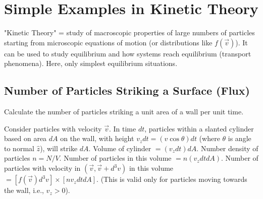 \documentclass[11pt]{article}
\begin{document}
\begin{itemize}
    \begin{center}
    \end{center}
\end{itemize}

\section*{Simple Examples in Kinetic Theory}

"Kinetic Theory" = study of macroscopic properties of large numbers of particles starting from microscopic equations of motion (or distributions like $f(\vec{v})$). It can be used to study equilibrium and how systems reach equilibrium (transport phenomena). Here, only simplest equilibrium situations.

\subsection*{Number of Particles Striking a Surface (Flux)}

Calculate the number of particles striking a unit area of a wall per unit time.

Consider particles with velocity $\vec{v}$. In time $dt$, particles within a slanted cylinder based on area $dA$ on the wall, with height $v_z dt = (v \cos\theta) dt$ (where $\theta$ is angle to normal $\hat{z}$), will strike $dA$.
Volume of cylinder $= (v_z dt) dA$.
Number density of particles $n=N/V$.
Number of particles in this volume $= n (v_z dt dA)$.
Number of particles with velocity in $(\vec{v}, \vec{v}+d^3v)$ in this volume $= [f(\vec{v})d^3v] \times [n v_z dt dA]$.
(This is valid only for particles moving towards the wall, i.e., $v_z > 0$).
\end{document}
